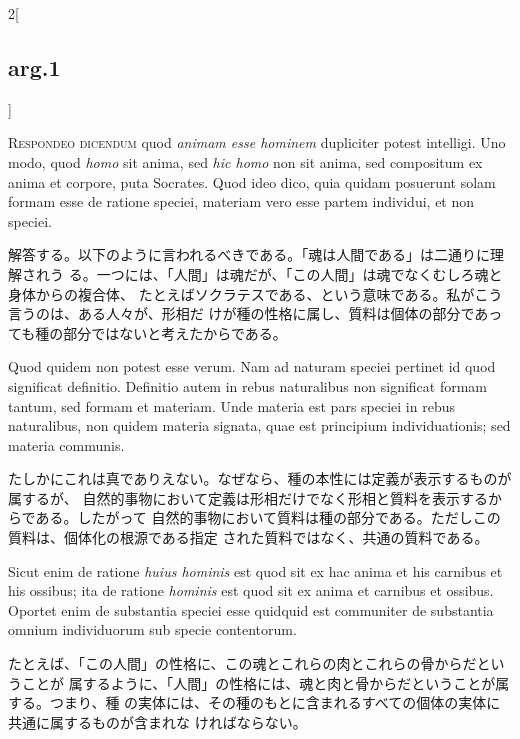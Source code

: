 \documentclass[paper=a4paper,fontsize=10pt,jafontsize=9pt,titlepage]{jlreq}
\begin{document}
\begin{paracol}{2}[\subsection{arg.1}]

{\scshape Respondeo dicendum} quod {\itshape animam esse hominem} dupliciter
potest intelligi. Uno modo, quod {\itshape homo} sit anima, sed {\itshape hic
homo} non sit anima, sed compositum ex anima et corpore, puta Socrates. Quod
ideo dico, quia quidam posuerunt solam formam esse de ratione speciei, materiam
vero esse partem individui, et non speciei.

\switchcolumn

解答する。以下のように言われるべきである。「魂は人間である」は二通りに理解されう
る。一つには、「人間」は魂だが、「この人間」は魂でなくむしろ魂と身体からの複合体、
たとえばソクラテスである、という意味である。私がこう言うのは、ある人々が、形相だ
けが種の性格に属し、質料は個体の部分であっても種の部分ではないと考えたからである。

\switchcolumn*

Quod quidem non potest esse verum. Nam ad naturam speciei pertinet id quod
significat definitio. Definitio autem in rebus naturalibus non significat formam
tantum, sed formam et materiam. Unde materia est pars speciei in rebus
naturalibus, non quidem materia signata, quae est principium individuationis;
sed materia communis.

\switchcolumn

たしかにこれは真でありえない。なぜなら、種の本性には定義が表示するものが属するが、
自然的事物において定義は形相だけでなく形相と質料を表示するからである。したがって
自然的事物において質料は種の部分である。ただしこの質料は、個体化の根源である指定
された質料ではなく、共通の質料である。


\switchcolumn*

Sicut enim de ratione {\itshape huius hominis} est quod sit ex hac anima et his
carnibus et his ossibus; ita de ratione {\itshape hominis} est quod sit ex anima
et carnibus et ossibus. Oportet enim de substantia speciei esse quidquid est
communiter de substantia omnium individuorum sub specie contentorum.

\switchcolumn

たとえば、「この人間」の性格に、この魂とこれらの肉とこれらの骨からだということが
属するように、「人間」の性格には、魂と肉と骨からだということが属する。つまり、種
の実体には、その種のもとに含まれるすべての個体の実体に共通に属するものが含まれな
ければならない。


\end{paracol}
\end{document}
